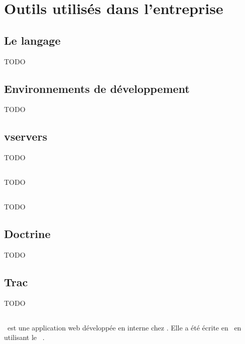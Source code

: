 \section{Outils utilisés dans l'entreprise}

\subsection{Le langage \aphp}

TODO

\subsection{Environnements de développement}

TODO

\subsection{vservers}

TODO

\subsection{\asvn}


TODO

\subsection{\asf}


TODO

\subsection{Doctrine}

TODO

\subsection{Trac}

TODO

\subsection{\asismo}
\label{section:sismo}

\asismo\ est une application web développée en interne chez \asl. Elle a été écrite en \aphp\ en utilisant le \afm\ \asf.

